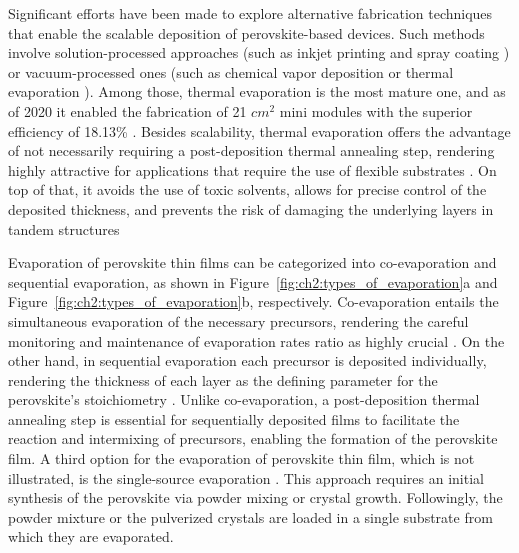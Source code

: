 Significant efforts have been made to explore alternative fabrication techniques that enable the scalable deposition of perovskite-based devices. Such methods involve solution-processed approaches (such as inkjet printing \cite{Zhang2023ProgressApplications} and spray coating \cite{Bishop2020DevelopmentCells}) or vacuum-processed ones (such as chemical vapor deposition \cite{Magubane2023SequentialTransport} or thermal evaporation \cite{Wang2024ThermallyBeyond}). Among those, thermal evaporation is the most mature one, and as of 2020 it enabled the fabrication of 21 $cm^2$ mini modules with the superior efficiency of 18.13\% \cite{Vaynzof2020TheProcessing, Li2020HighlyMini-modules}. Besides scalability, thermal evaporation offers the advantage of not necessarily requiring a post-deposition thermal annealing step, rendering highly attractive for applications that require the use of flexible substrates \cite{Becker2019LowExperimentation}. On top of that, it avoids the use of toxic solvents, allows for precise control of the deposited thickness, and prevents the risk of damaging the underlying layers in tandem structures \cite{Zhang2020TowardCells, Forgacs2017EfficientCells}

Evaporation of perovskite thin films can be categorized into co-evaporation and sequential evaporation, as shown in Figure~\ref{fig:ch2:types_of_evaporation}a and Figure~\ref{fig:ch2:types_of_evaporation}b, respectively. Co-evaporation entails the simultaneous evaporation of the necessary precursors, rendering the careful monitoring and maintenance of evaporation rates ratio as highly crucial \cite{Frolova2017HighlyPbI2,Abzieher2021FromCells}. On the other hand, in sequential evaporation each precursor is deposited individually, rendering the thickness of each layer as the defining parameter for the perovskite's stoichiometry \cite{Liu2019SequentiallyCells, Burschka2013SequentialCells, SupportingMaterialSequentialEfficiency}. Unlike co-evaporation, a post-deposition thermal annealing step is essential for sequentially deposited films to facilitate the reaction and intermixing of precursors, enabling the formation of the perovskite film. A third option for the evaporation of perovskite thin film, which is not illustrated, is the single-source evaporation \cite{Zheng2019SingleApplications, Soto-Montero2024Single-SourceCells, Li2020FabricationEvaporation}. This approach requires an initial synthesis of the perovskite via powder mixing or crystal growth. Followingly, the powder mixture or the pulverized crystals are loaded in a single substrate from which they are evaporated. 


